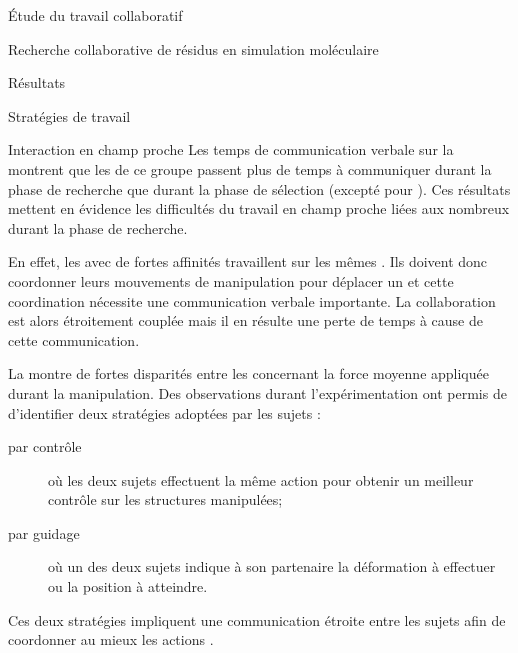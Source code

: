 \documentclass[myfrancais]{mythesis}
\begin{document}
\begin{mypart}{Étude du travail collaboratif}
\begin{mychapter}{Recherche collaborative de résidus en simulation moléculaire}
\begin{mysection}{Résultats}
\begin{mysubsection}{Stratégies de travail}
\begin{mysubsubsection}{Interaction en champ proche}
						Les temps de communication verbale sur la  montrent que les  de ce groupe passent plus de temps à communiquer durant la phase de recherche que durant la phase de sélection (excepté pour ).
						Ces résultats mettent en évidence les difficultés du travail en champ proche liées aux nombreux  durant la phase de recherche.

						En effet, les  avec de fortes affinités travaillent sur les mêmes .
						Ils doivent donc coordonner leurs mouvements de manipulation pour déplacer un  et cette coordination nécessite une communication verbale importante.
						La collaboration est alors étroitement couplée mais il en résulte une perte de temps à cause de cette communication.

						La  montre de fortes disparités entre les  concernant la force moyenne appliquée durant la manipulation.
						Des observations durant l'expérimentation ont permis de d'identifier deux stratégies adoptées par les sujets :
						\begin{description}
							\item[par contrôle] où les deux sujets effectuent la même action pour obtenir un meilleur contrôle sur les structures manipulées;
							\item[par guidage] où un des deux sujets indique à son partenaire la déformation à effectuer ou la position à atteindre.
						\end{description}
						Ces deux stratégies impliquent une communication étroite entre les sujets afin de coordonner au mieux les actions .


\end{mysubsubsection}
\end{mysubsection}
\end{mysection}
\end{mychapter}
\end{mypart}
\end{document}
